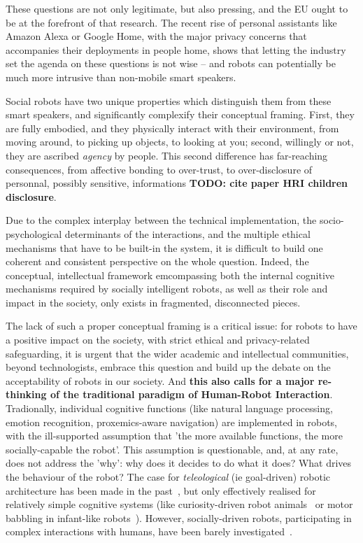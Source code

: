 \documentclass[11pt]{report}
\newcommand{\TODO}[1]{{\color{red}\textbf{TODO: #1}}}
\begin{document}
These questions are not only legitimate, but also pressing, and the EU ought to
be at the forefront of that research. The recent rise of
personal assistants like Amazon Alexa or Google Home, with the major privacy concerns
that accompanies their deployments in people home, shows that letting the
industry set the agenda on these questions is not wise -- and robots can
potentially be much more intrusive than non-mobile smart speakers.

Social robots have two unique properties which distinguish them from these smart
speakers, and significantly complexify their conceptual framing. First, they are
fully embodied, and they physically interact with their environment, from moving
around, to picking up objects, to looking at you; second, willingly or not, they
are ascribed \emph{agency} by people.  This second difference has far-reaching
consequences, from affective bonding to over-trust, to over-disclosure of
personnal, possibly sensitive, informations \TODO{cite paper HRI children
disclosure}.

Due to the complex interplay between the technical implementation, the
socio-psychological determinants of the interactions, and the multiple ethical
mechanisms that have to be built-in the system, it is difficult to build one
coherent and consistent perspective on the whole question. Indeed, the
conceptual, intellectual framework emcompassing both the internal cognitive
mechanisms required by socially intelligent robots, as well as their role and
impact in the society, only exists in fragmented, disconnected pieces.


The lack of such a proper conceptual framing is a critical issue: for robots to
have a positive impact on the society, with strict ethical and privacy-related
safeguarding, it is urgent that the wider academic and intellectual communities,
beyond technologists, embrace this question and build up the debate on the
acceptability of robots in our society. And \textbf{this also calls for a major
re-thinking of the traditional paradigm of Human-Robot Interaction}.
Tradionally, individual cognitive functions (like natural language processing,
emotion recognition, proxemics-aware navigation) are implemented in robots, with
the ill-supported assumption that 'the more available functions, the more
socially-capable the robot'. This assumption is questionable, and, at any rate,
does not address the 'why': why does it decides to do what it does? What drives
the behaviour of the robot? The case for \emph{teleological} (ie goal-driven)
robotic architecture has been made in the past~\cite{oudeyer}, but only
effectively realised for relatively simple cognitive systems (like
curiosity-driven robot animals~\cite{oudeyer,isir} or motor babbling in
infant-like robots~\cite{cangelosi,iit}). However, socially-driven robots,
participating in complex interactions with humans, have been barely
investigated~\cite{needacite}.
\end{document}
